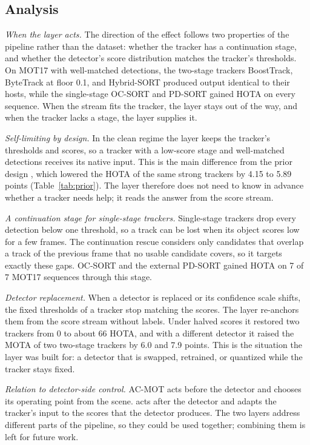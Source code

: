 \subsection{Analysis}\label{sec:discussion}

\emph{When the layer acts.} The direction of the effect follows two
properties of the pipeline rather than the dataset: whether the tracker has a
continuation stage, and whether the detector's score distribution matches the
tracker's thresholds. On MOT17 with well-matched detections, the two-stage
trackers BoostTrack, ByteTrack at floor 0.1, and Hybrid-SORT produced output
identical to their hosts, while the single-stage OC-SORT and PD-SORT gained
HOTA on every sequence. When the stream fits the tracker, the layer stays out
of the way, and when the tracker lacks a stage, the layer supplies it.

\emph{Self-limiting by design.} In the clean regime the layer keeps the
tracker's thresholds and scores, so a tracker with a low-score stage and
well-matched detections receives its native input. This is the main
difference from the prior design \aob{}, which lowered the HOTA of the same strong
trackers by 4.15 to 5.89 points (Table~\ref{tab:prior}). The layer therefore does not
need to know in advance whether a tracker needs help; it reads the answer from
the score stream.

\emph{A continuation stage for single-stage trackers.} Single-stage trackers
drop every detection below one threshold, so a track can be lost when its
object scores low for a few frames. The continuation rescue considers only
candidates that overlap a track of the previous frame that no usable candidate
covers, so it targets exactly these gaps. OC-SORT and the external PD-SORT
gained HOTA on 7 of 7 MOT17 sequences through this stage.

\emph{Detector replacement.} When a detector is replaced or its confidence
scale shifts, the fixed thresholds of a tracker stop matching the scores. The
layer re-anchors them from the score stream without labels. Under halved
scores it restored two trackers from 0 to about 66 HOTA, and with a different
detector it raised the MOTA of two two-stage trackers by 6.0 and 7.9 points.
This is the situation the layer was built for: a detector that is swapped,
retrained, or quantized while the tracker stays fixed.

\emph{Relation to detector-side control.} AC-MOT \cite{ismail2026acmot}
acts before the detector and chooses its operating point from the scene.
\scl{} acts after the detector and adapts the tracker's input to the scores
that the detector produces. The two layers address different parts of the
pipeline, so they could be used together; combining them is left for future
work.

